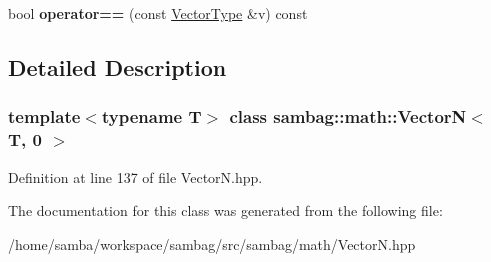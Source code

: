 \begin{DoxyCompactItemize}
\item 
\hypertarget{classsambag_1_1math_1_1_vector_n_3_01_t_00_010_01_4_a27c2e492c8f82307a138af3cb21742ab}{
bool {\bfseries operator==} (const \hyperlink{classsambag_1_1math_1_1_vector_n}{VectorType} \&v) const }
\label{classsambag_1_1math_1_1_vector_n_3_01_t_00_010_01_4_a27c2e492c8f82307a138af3cb21742ab}

\end{DoxyCompactItemize}


\subsection{Detailed Description}
\subsubsection*{template$<$typename T$>$ class sambag::math::VectorN$<$ T, 0 $>$}



Definition at line 137 of file VectorN.hpp.



The documentation for this class was generated from the following file:\begin{DoxyCompactItemize}
\item 
/home/samba/workspace/sambag/src/sambag/math/VectorN.hpp\end{DoxyCompactItemize}
